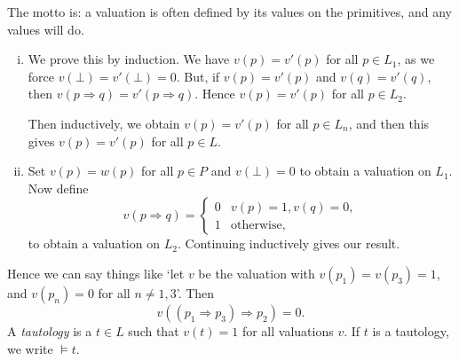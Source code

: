 \documentclass[12pt]{article}
\begin{document}
The motto is: a valuation is often defined by its values on the primitives, and any values will do.

\begin{proofbox}
	\begin{enumerate}[(i)]
		\item We prove this by induction. We have $v(p) = v'(p)$ for all $p \in L_1$, as we force $v(\bot) = v'(\bot) = 0$. But, if $v(p) = v'(p)$ and $v(q) = v'(q)$, then $v(p \Rightarrow q) = v'(p \Rightarrow q)$. Hence $v(p) = v'(p)$ for all $p \in L_2$.

			Then inductively, we obtain $v(p) = v'(p)$ for all $p \in L_n$, and then this gives $v(p) = v'(p)$ for all $p \in L$.
		\item Set $v(p) = w(p)$ for all $p \in P$ and $v(\bot) = 0$ to obtain a valuation on $L_1$. Now define
			\[
			v(p \Rightarrow q) =
			\begin{cases}
				0 & v(p) = 1, v(q) = 0, \\
				1 & \text{otherwise},
			\end{cases}
			\]
			to obtain a valuation on $L_2$. Continuing inductively gives our result.
	\end{enumerate}
\end{proofbox}

Hence we can say things like `let $v$ be the valuation with $v(p_1) = v(p_3) = 1$, and $v(p_n) = 0$ for all $n \neq 1, 3$'. Then
\[
v((p_1 \Rightarrow p_3) \Rightarrow p_2) = 0
.\]
A \emph{tautology} is a $t \in L$ such that $v(t) = 1$ for all valuations $v$. If $t$ is a tautology, we write $\models t$.
\end{document}
